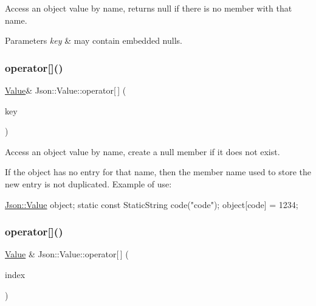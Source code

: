Access an object value by name, returns null if there is no member with that name. 
\begin{DoxyParams}{Parameters}
{\em key} & may contain embedded nulls. \\
\hline
\end{DoxyParams}
\hypertarget{class_json_1_1_value_ac191343a7ee2ca54827d67d934200d4f}{}\label{class_json_1_1_value_ac191343a7ee2ca54827d67d934200d4f} 
\subsubsection{\texorpdfstring{operator[]()}{operator[]()}\hspace{0.1cm}{\footnotesize\ttfamily [9/18]}}
{\footnotesize\ttfamily \hyperlink{class_json_1_1_value}{Value}\& Json\+::\+Value\+::operator\mbox{[}$\,$\mbox{]} (\begin{DoxyParamCaption}\item[{const \hyperlink{class_json_1_1_static_string}{Static\+String} \&}]{key }\end{DoxyParamCaption})}



Access an object value by name, create a null member if it does not exist. 

If the object has no entry for that name, then the member name used to store the new entry is not duplicated. Example of use\+: 
\begin{DoxyCode}
\hyperlink{class_json_1_1_value}{Json::Value} object;
\textcolor{keyword}{static} \textcolor{keyword}{const} StaticString code(\textcolor{stringliteral}{"code"});
\textcolor{keywordtype}{object}[code] = 1234;
\end{DoxyCode}
 \hypertarget{class_json_1_1_value_a7d99f5dba388cdaa152ce6ef933d64ef}{}\label{class_json_1_1_value_a7d99f5dba388cdaa152ce6ef933d64ef} 
\subsubsection{\texorpdfstring{operator[]()}{operator[]()}\hspace{0.1cm}{\footnotesize\ttfamily [10/18]}}
{\footnotesize\ttfamily \hyperlink{class_json_1_1_value}{Value} \& Json\+::\+Value\+::operator\mbox{[}$\,$\mbox{]} (\begin{DoxyParamCaption}\item[{\hyperlink{class_json_1_1_value_a184a91566cccca7b819240f0d5561c7d}{Array\+Index}}]{index }\end{DoxyParamCaption})}

